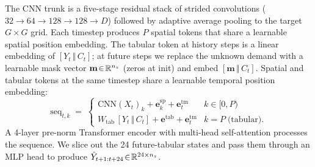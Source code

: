 \documentclass[11pt,letterpaper]{article}
\begin{document}
The CNN trunk is a five-stage residual stack \citep{he2016resnet} of strided convolutions ($32 \to 64 \to 128 \to 128 \to D$) followed by adaptive average pooling to the target $G{\times}G$ grid. Each timestep produces $P$ spatial tokens that share a learnable spatial position embedding. The tabular token at history steps is a linear embedding of $[Y_t \,\Vert\, C_t]$; at future steps we replace the unknown demand with a learnable mask vector $\mathbf{m}\!\in\!\mathbb{R}^{n_{z}}$ (zeros at init) and embed $[\mathbf{m}\,\Vert\, C_t]$. Spatial and tabular tokens at the same timestep share a learnable temporal position embedding:
\begin{equation}
    \mathrm{seq}_{t,k} \;=\; \begin{cases} \mathrm{CNN}(X_t)_{k} + \mathbf{e}_{k}^{\mathrm{sp}} + \mathbf{e}_{t}^{\mathrm{tm}} & k\in[0,P) \\ W_{\mathrm{tab}}\,[Y_t\,\Vert\,C_t] + \mathbf{e}^{\mathrm{tab}} + \mathbf{e}_{t}^{\mathrm{tm}} & k=P\;\text{(tabular)}. \end{cases}
    \label{eq:assembly}
\end{equation}
A 4-layer pre-norm Transformer encoder with multi-head self-attention \citep{vaswani2017attention,ba2016layernorm} processes the sequence. We slice out the 24 future-tabular states and pass them through an MLP head to produce $\hat Y_{t+1:t+24}\!\in\!\mathbb{R}^{24\times n_{z}}$.
\end{document}
